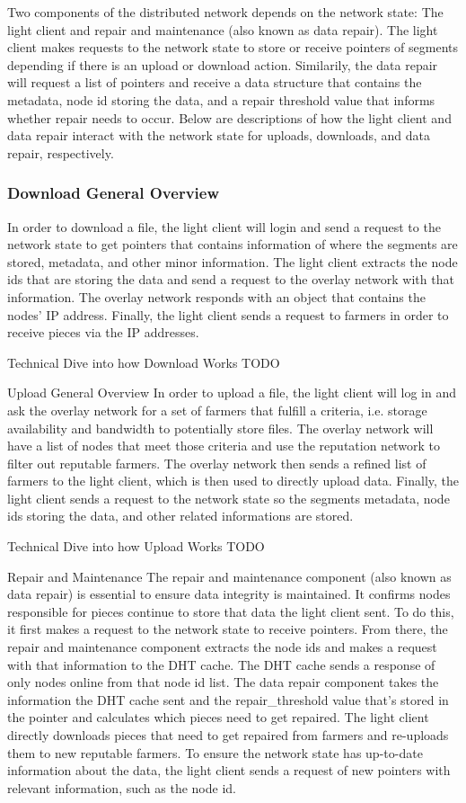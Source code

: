 \documentclass[a4paper,10pt]{article}
\newcommand{\todo}[1]{{\color{red} TODO #1}}
\begin{document}
Two components of the distributed network depends on the network state: The light client and repair and maintenance (also known as data repair).  The light client makes requests to the network state to store or receive pointers of segments depending if there is an upload or download action. Similarily, the data repair will request a list of pointers and receive a data structure that contains the metadata, node id storing the data, and a repair threshold value that informs whether repair needs to occur. Below are descriptions of how the light client and data repair interact with the network state for uploads, downloads, and data repair, respectively.
 

\subsubsection{Download General Overview}
In order to download a file, the light client will login and send a request to the network state to get pointers that contains information of where the segments are stored, metadata, and other minor information.  The light client extracts the node ids that are storing the data and send a request to the overlay network with that information. The overlay network responds with an object that contains the nodes’ IP address.  Finally, the light client sends a request to farmers in order to receive pieces via the IP addresses.


Technical Dive into how Download Works
\todo{}

Upload General Overview
In order to upload a file, the light client will log in and ask the overlay network for a set of farmers that fulfill a criteria, i.e. storage availability and bandwidth to potentially store files. The overlay network will have a list of nodes that meet those criteria and use the reputation network to filter out reputable farmers. The overlay network then sends a refined list of farmers to the light client, which is then used to directly upload data. Finally, the light client sends a request to the network state so the segments metadata, node ids storing the data, and other related informations are stored. 


Technical Dive into how Upload Works
\todo{}

Repair and Maintenance
The repair and maintenance component (also known as data repair) is essential to ensure data integrity is maintained.  It confirms nodes responsible for pieces continue to store that data the light client sent. To do this, it first makes a request to the network state to receive pointers. From there, the repair and maintenance component extracts the node ids and makes a request with that information to the DHT cache. The DHT cache sends a response of only nodes online from that node id list. The data repair component takes the information the DHT cache sent and the repair_threshold value that's stored in the pointer and calculates which pieces need to get repaired. The light client directly downloads pieces that need to get repaired from farmers and re-uploads them to new reputable farmers. To ensure the network state has up-to-date information about the data, the light client sends a request of new pointers with relevant information, such as the node id.
\end{document}
